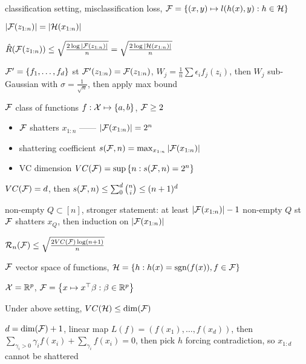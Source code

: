 \begin{setting}
    classification setting, misclassification loss, $\mathcal{F} = \left\{ (x, y) \mapsto l(h(x), y) : h \in \mathcal{H}\right\}$
\end{setting}
\begin{fact}
    $|\mathcal{F}(z_{1:n})| = |\mathcal{H}(x_{1:n})|$
\end{fact}

\begin{lemma}
    $\hat R(\mathcal{F}(z_{1:n})) \leq \sqrt{\frac{2 \log |\mathcal{F}(z_{1:n})|}{n}} = \sqrt{\frac{2 \log |\mathcal{H}(x_{1:n})|}{n}}$
\end{lemma}
\begin{pf}
    $\mathcal{F}' = \left\{ f_1, \dots, f_d \right\}$ st $\mathcal{F}'(z_{1:n}) = \mathcal{F}(z_{1:n})$, $W_j = \frac{1}{n} \sum \epsilon_i f_j(z_i)$,
    then $W_j$ sub-Gaussian with $\sigma = \frac{1}{\sqrt{n}}$, then apply max bound
\end{pf}

\begin{setting}
    $\mathcal{F}$ class of functions $f : \mathcal{X} \mapsto \left\{ a, b \right\}$, $\mathcal{F} \geq 2$
\end{setting}

\begin{itemize}
    \item $\mathcal{F}$ shatters $x_{1:n}$ ------ $|\mathcal{F}(x_{1:n})| = 2^n$
    \item shattering coefficient $s(\mathcal{F}, n) = \max_{x_{1:n}} |\mathcal{F}(x_{1:n})|$
    \item VC dimension $VC(\mathcal{F}) = \sup \left\{ n : s(\mathcal{F}, n) = 2^n \right\}$
\end{itemize}

\begin{lemma}
    $VC(\mathcal{F}) = d$, then $s(\mathcal{F}, n) \leq \sum_0^d {n \choose i} \leq (n+1)^d$
\end{lemma}
\begin{pf}
    non-empty $Q \subset [n]$, stronger statement: at least $|\mathcal{F}(x_{1:n})| - 1$ non-empty $Q$ st $\mathcal{F}$ shatters $x_Q$,
    then induction on $|\mathcal{F}(x_{1:n})|$
\end{pf}

\begin{fact}
    $\mathcal{R}_n(\mathcal{F}) \leq \sqrt{\frac{2 VC(\mathcal{F}) \log(n+1)}{n}}$
\end{fact}

\begin{setting}
    $\mathcal{F}$ vector space of functions, $\mathcal{H} = \left\{ h : h(x) = \textnormal{sgn}(f(x)), f\in \mathcal{F} \right\}$
\end{setting}
\begin{example}
    $\mathcal{X} = \mathbb{R}^p$, $\mathcal{F} = \left\{ x \mapsto x^\top \beta : \beta \in \mathbb{R}^p \right\}$
\end{example}

\begin{prop}
    Under above setting, $VC(\mathcal{H}) \leq \dim(\mathcal{F})$
\end{prop}
\begin{pf}
    $d= \dim(\mathcal{F}) + 1$, linear map $L(f) = (f(x_1), \dots, f(x_d))$, then $\sum_{\gamma_i > 0} \gamma_i f(x_i) + \sum_{\gamma_i} f(x_i) = 0$, then pick $h$ forcing
    contradiction, so $x_{1:d}$ cannot be shattered
\end{pf}



